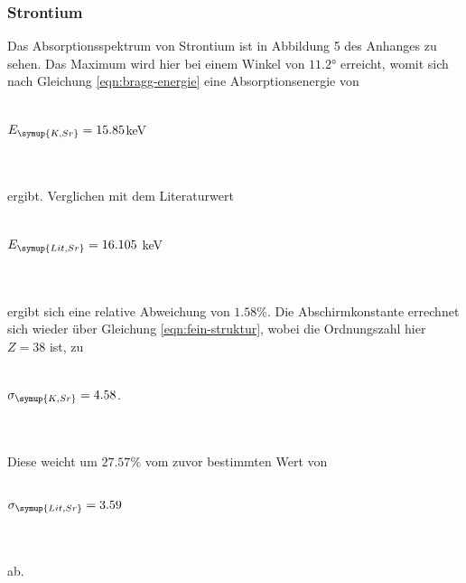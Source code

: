         \subsubsection{Strontium}
            Das Absorptionsspektrum von Strontium ist in Abbildung 5 des Anhanges zu sehen.
            Das Maximum wird hier bei einem Winkel von $11.2°$ erreicht, womit sich nach 
            Gleichung \eqref{eqn:bragg-energie} eine Absorptionsenergie von 
            \\ \\
            \centerline{$E_{\symup{K, Sr}} = 15.85$keV}  
            \\ \\
            ergibt. Verglichen mit dem Literaturwert
            \\ \\
            \centerline{$E_{\symup{Lit, Sr}} = 16.105$ keV \cite{periodic}}
            \\ \\
            ergibt sich eine relative Abweichung von $1.58 \%$. Die Abschirmkonstante
            errechnet sich wieder über Gleichung \eqref{eqn:fein-struktur}, wobei die
            Ordnungszahl hier $Z = 38$ ist, zu
            \\ \\
            \centerline{$\sigma_{\symup{K, Sr}} = 4.58$.} 
            \\ \\
            Diese weicht um $27.57 \%$ vom zuvor bestimmten Wert von 
            \\ \\
            \centerline{$\sigma_{\symup{Lit, Sr}} = 3.59$}
            \\ \\
            ab.

